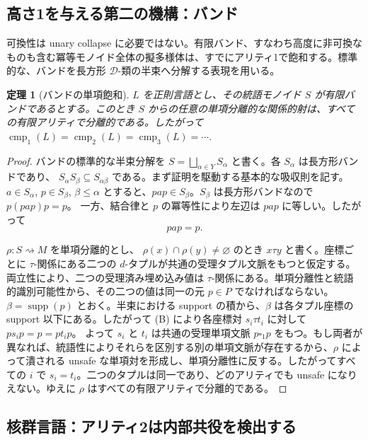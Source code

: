 \documentclass[10pt,a4paper]{ltjsarticle}
\newtheorem{theorem}{定理}[section]
\theoremstyle{definition}
\theoremstyle{remark}
\newcommand{\cmp}{\operatorname{cmp}}
\newcommand{\blank}{\square}
\newcommand{\relto}{\mathrel{\rightsquigarrow}}
\begin{document}
\subsection{高さ1を与える第二の機構：バンド}

可換性は unary collapse に必要ではない。有限バンド、すなわち高度に非可換なものも含む冪等モノイド全体の擬多様体は、すでにアリティ1で飽和する。標準的な、バンドを長方形 $\mathcal D$-類の半束へ分解する表現を用いる。

\begin{theorem}[バンドの単項飽和]
\label{band:thm:unary-saturation}
$L$ を正則言語とし、その統語モノイド $S$ が有限バンドであるとする。このとき $S$ からの任意の単項分離的な関係的射は、すべての有限アリティで分離的である。したがって
\(\cmp_1(L)=\cmp_2(L)=\cmp_3(L)=\cdots.\)
\end{theorem}

\begin{proof}
バンドの標準的な半束分解を
\(S=\bigsqcup_{\alpha\in Y}S_\alpha\)
と書く。各 $S_\alpha$ は長方形バンドであり、
\(S_\alpha S_\beta\subseteq S_{\alpha\beta}\)
である。まず証明を駆動する基本的な吸収則を記す。
$a\in S_\alpha$, $p\in S_\beta$, $\beta\le\alpha$ とすると、$pap\in S_\beta$。$S_\beta$ は長方形バンドなので
$p(pap)p=p$。
一方、結合律と $p$ の冪等性により左辺は $pap$ に等しい。したがって
\[
 pap=p.
\tag{B}
\]

\(\rho:S\relto M\)
を単項分離的とし、
\(\rho(x)\cap\rho(y)\ne\varnothing\)
のとき $x\tau y$ と書く。座標ごとに $\tau$-関係にある二つの $d$-タプルが共通の受理タプル文脈をもつと仮定する。両立性により、二つの受理済み埋め込み値は $\tau$-関係にある。単項分離性と統語的識別可能性から、その二つの値は同一の元 $p\in P$ でなければならない。
\(\beta=\operatorname{supp}(p)\)
とおく。半束における support の積から、$\beta$ は各タプル座標の support 以下にある。したがって \textup{(B)} により各座標対 $s_i\tau t_i$ に対して
\(p s_i p=p=p t_i p\)。
よって $s_i$ と $t_i$ は共通の受理単項文脈
$p\blank_1p$
をもつ。もし両者が異なれば、統語性によりそれらを区別する別の単項文脈が存在するから、$\rho$ によって潰される unsafe な単項対を形成し、単項分離性に反する。したがってすべての $i$ で $s_i=t_i$。二つのタプルは同一であり、どのアリティでも unsafe になりえない。ゆえに $\rho$ はすべての有限アリティで分離的である。
\end{proof}

\subsection{核群言語：アリティ2は内部共役を検出する}
\end{document}
